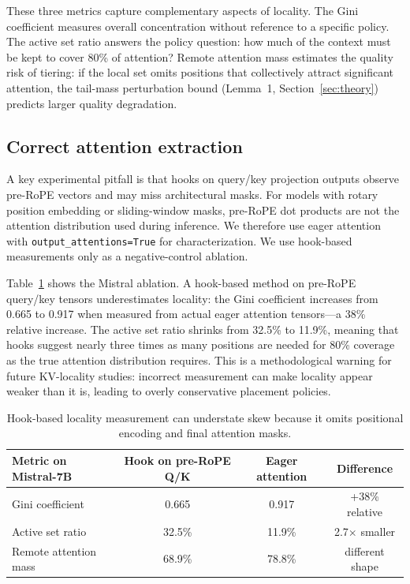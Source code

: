 \documentclass[11pt]{article}
\newcommand{\pct}{\%}
\theoremstyle{definition}
\theoremstyle{plain}
\begin{document}
These three metrics capture complementary aspects of locality.  The Gini coefficient measures overall concentration without reference to a specific policy.  The active set ratio answers the policy question: how much of the context must be kept to cover 80\pct{} of attention?  Remote attention mass estimates the quality risk of tiering: if the local set omits positions that collectively attract significant attention, the tail-mass perturbation bound (Lemma~1, Section~\ref{sec:theory}) predicts larger quality degradation.

\subsection{Correct attention extraction}
A key experimental pitfall is that hooks on query/key projection outputs observe pre-RoPE vectors and may miss architectural masks.  For models with rotary position embedding or sliding-window masks, pre-RoPE dot products are not the attention distribution used during inference.  We therefore use eager attention with \texttt{output\_attentions=True} for characterization.  We use hook-based measurements only as a negative-control ablation.

Table~\ref{tab:hook-eager} shows the Mistral ablation.  A hook-based method on pre-RoPE query/key tensors underestimates locality: the Gini coefficient increases from 0.665 to 0.917 when measured from actual eager attention tensors---a 38\pct{} relative increase.  The active set ratio shrinks from 32.5\pct{} to 11.9\pct{}, meaning that hooks suggest nearly three times as many positions are needed for 80\pct{} coverage as the true attention distribution requires.  This is a methodological warning for future KV-locality studies: incorrect measurement can make locality appear weaker than it is, leading to overly conservative placement policies.

\begin{table}[t]
\centering
\caption{Hook-based locality measurement can understate skew because it omits positional encoding and final attention masks.}
\label{tab:hook-eager}
\small
\begin{tabular}{lccc}
\toprule
Metric on Mistral-7B & Hook on pre-RoPE Q/K & Eager attention & Difference \\
\midrule
Gini coefficient & 0.665 & 0.917 & +38\pct{} relative \\
Active set ratio & 32.5\pct{} & 11.9\pct{} & 2.7$\times$ smaller \\
Remote attention mass & 68.9\pct{} & 78.8\pct{} & different shape \\
\bottomrule
\end{tabular}
\end{table}
\end{document}
